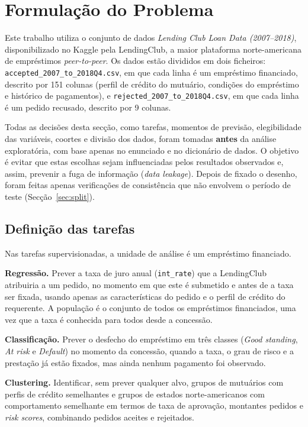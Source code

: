 \section{Formulação do Problema}
\label{sec:formulacao}

Este trabalho utiliza o conjunto de dados \textit{Lending Club Loan Data (2007--2018)}, disponibilizado no Kaggle pela LendingClub, a maior plataforma norte-americana de empréstimos \textit{peer-to-peer}. Os dados estão divididos em dois ficheiros: \texttt{accepted\_2007\_to\_2018Q4.csv}, em que cada linha é um empréstimo financiado, descrito por 151 colunas (perfil de crédito do mutuário, condições do empréstimo e histórico de pagamentos), e \texttt{rejected\_2007\_to\_2018Q4.csv}, em que cada linha é um pedido recusado, descrito por 9 colunas.

Todas as decisões desta secção, como tarefas, momentos de previsão, elegibilidade das variáveis, coortes e divisão dos dados, foram tomadas \textbf{antes} da análise exploratória, com base apenas no enunciado e no dicionário de dados. O objetivo é evitar que estas escolhas sejam influenciadas pelos resultados observados e, assim, prevenir a fuga de informação (\textit{data leakage}). Depois de fixado o desenho, foram feitas apenas verificações de consistência que não envolvem o período de teste (Secção~\ref{sec:split}).


\subsection{Definição das tarefas}

Nas tarefas supervisionadas, a unidade de análise é um empréstimo financiado.

\textbf{Regressão.} Prever a taxa de juro anual (\texttt{int\_rate}) que a LendingClub atribuiria a um pedido, no momento em que este é submetido e antes de a taxa ser fixada, usando apenas as características do pedido e o perfil de crédito do requerente. A população é o conjunto de todos os empréstimos financiados, uma vez que a taxa é conhecida para todos desde a concessão.

\textbf{Classificação.} Prever o desfecho do empréstimo em três classes (\textit{Good standing},
\textit{At risk} e \textit{Default}) no momento da concessão, quando a taxa, o grau de risco e a
prestação já estão fixados, mas ainda nenhum pagamento foi observado.

\textbf{Clustering.} Identificar, sem prever qualquer alvo, grupos de mutuários com perfis de crédito semelhantes e grupos de estados norte-americanos com comportamento semelhante em termos de taxa de aprovação, montantes pedidos e \textit{risk scores}, combinando pedidos aceites e rejeitados.



